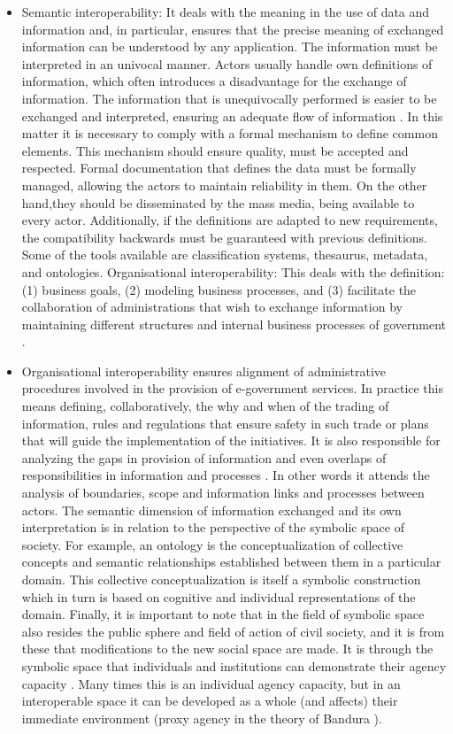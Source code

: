 \documentclass[10pt,twocolumn,ieeetran]{article}
\begin{document}
\begin{itemize}
\item Semantic interoperability: It deals with the meaning in the use of data and information and, in particular, ensures that the precise meaning of exchanged information can be understood by any application. The information must be interpreted in an univocal manner. Actors usually handle own definitions of information, which often introduces a disadvantage for the exchange of information. The information that is unequivocally performed is easier to be exchanged and interpreted, ensuring an adequate flow of information \cite{Moreno}.
In this matter it is necessary to comply with a formal mechanism to define common elements. This mechanism should ensure quality, must be accepted and respected. Formal documentation that defines the data  must  be formally managed, allowing  the actors to maintain reliability in them.  On the other hand,they should be disseminated by the mass media, being  available to every actor. Additionally, if the definitions are adapted to new requirements,  the compatibility backwards must be guaranteed  with previous definitions. Some of the tools available are classification systems, thesaurus, metadata, and ontologies. 
Organisational interoperability: This deals with the definition: (1) business goals, (2) modeling business processes, and (3) facilitate the collaboration of administrations that wish to exchange information by maintaining different structures and internal business processes of government \cite{Moreno}.

\item Organisational interoperability ensures alignment of administrative procedures involved in the provision of e-government services. In practice this means  defining, collaboratively, the why and when  of  the trading of information, rules and regulations that ensure safety in such trade or plans that will guide the implementation of the initiatives.
It is also responsible for analyzing the gaps in provision of information and even overlaps of responsibilities in information and processes \cite{Moreno}. In other words  it attends  the analysis of boundaries, scope and information links and processes between actors.
The semantic dimension of information exchanged and its own interpretation is in relation to the perspective of the symbolic space of society. For example, an ontology is the conceptualization of collective concepts and semantic relationships established between them in a particular domain.
This collective conceptualization is itself a symbolic construction which in turn is based on cognitive and individual representations of the domain. Finally, it is important to note that in the field of symbolic space also resides the public sphere and field of action of civil society, and it is from these that modifications to the new social space are made.
It is through the symbolic space that individuals and institutions can demonstrate their agency capacity  \cite{Bandura}. Many times this is an individual agency capacity, but in an interoperable space  it can be developed as a whole (and affects) their immediate environment (proxy agency in the theory of Bandura \cite{Bandura}).



\end{itemize}
\end{document}
